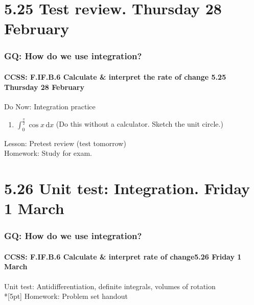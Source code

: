 \documentclass{beamer}
\begin{document}
\section{5.25 Test review. Thursday 28 February}
  \frame
  {
    \frametitle{GQ: How do we use integration?}
    \framesubtitle{CCSS: F.IF.B.6 Calculate \& interpret the rate of change \hfill \alert{5.25 Thursday 28 February}}

    \begin{block}{Do Now: Integration practice}
    \begin{enumerate}
      \item $\displaystyle \int_0^{\frac{\pi}{2}} \cos x \,\mathrm{d}x$ (Do this without a calculator. Sketch the unit circle.)
    \end{enumerate}
    \end{block}
    Lesson: Pretest review (\alert{test tomorrow})\\%
    Homework: Study for exam.\\
  }

\section{5.26 Unit test: Integration. Friday 1 March}
\frame
{
  \frametitle{GQ: How do we use integration?}
  \framesubtitle{CCSS: F.IF.B.6 Calculate \& interpret rate of change\hfill \alert{5.26 Friday 1 March}}

  \alert{Unit test:} Antidifferentiation, definite integrals, volumes of rotation\\*[5pt]
  Homework: Problem set handout
}
\end{document}
